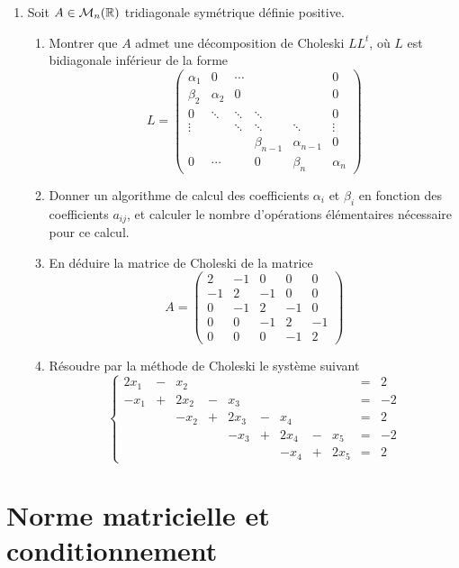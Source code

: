 \documentclass[a4paper]{article}
\begin{document}
\begin{enumerate}
\item Soit $A\in{\cal M}_n(\mathbb{R})$ tridiagonale symétrique définie positive.
\begin{enumerate}
\item Montrer que $A$ admet une décomposition de Choleski $LL^t$, où $L$ est bidiagonale inférieur de la forme
\[L=\left(\begin{array}{cccccc}
\alpha_1&0&\cdots & & &0\\
\beta_2&\alpha_2 &0& & &0 \\
0&\ddots &\ddots &\ddots & & 0\\
\vdots&&\ddots&\ddots&\ddots&\vdots\\
  & & &\beta_{n-1}&\alpha_{n-1}&0\\
0&\cdots& &0&\beta_n&\alpha_n
\end{array}\right)
\]
\item Donner un algorithme de calcul des coefficients $\alpha_i$ et $\beta_i$ en fonction des coefficients $a_{ij}$, et calculer le nombre d'opérations élémentaires nécessaire pour ce calcul.
\item En déduire la matrice de Choleski de la matrice 
\[A=\left(\begin{array}{ccccc}
2&-1&0 & 0& 0\\
-1&2 &-1&0  &0 \\
0&-1 &2 &-1 &  0\\
0&0&-1&2&-1\\
  0&0&0&-1&2
\end{array}\right)
\]
\item Résoudre par la méthode de Choleski le système suivant
\[\left\{\begin{array}{ccccccccccr}
2x_1&-&x_2&& && & &&=&2\\
-x_1&+&2x_2 &-&x_3&& & &&=&-2\\
&&-x_2 &+&2x_3 &-&x_4& &&=&2\\
&&&&-x_3&+&2x_4&-&x_5&=&-2\\
  &&&&&&-x_4&+&2x_5&=&2
\end{array}\right.
\]


\end{enumerate}


\end{enumerate}

\section{Norme matricielle et conditionnement}
\end{document}
